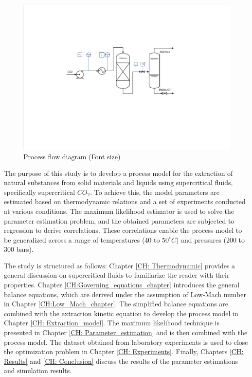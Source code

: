 \documentclass[../Article_Model_Parameters.tex]{subfiles}
\begin{document}
	\begin{figure}[h!]
		\centering
		\includegraphics[width=0.95\columnwidth]{Figures/SFE_PFD_cropped.pdf}
		\caption{Process flow diagram ({\color{red}Font size}) }
		\label{fig: SFE_drawing}
	\end{figure}

	The purpose of this study is to develop a process model for the extraction of natural substances from solid materials and liquids using supercritical fluids, specifically supercritical $CO_2$. To achieve this, the model parameters are estimated based on thermodynamic relations and a set of experiments conducted at various conditions. The maximum likelihood estimator is used to solve the parameter estimation problem, and the obtained parameters are subjected to regression to derive correlations. These correlations enable the process model to be generalized across a range of temperatures (40 to $50^\circ C$) and pressures (200 to 300 bars).
	
	The study is structured as follows: Chapter \ref{CH: Thermodynamic} provides a general discussion on supercritical fluids to familiarize the reader with their properties. Chapter \ref{CH:Governing_equations_chapter} introduces the general balance equations, which are derived under the assumption of Low-Mach number in Chapter \ref{CH:Low_Mach_chapter}. The simplified balance equations are combined with the extraction kinetic equation to develop the process model in Chapter \ref{CH: Extraction_model}. The maximum likelihood technique is presented in Chapter \ref{CH: Parameter_estimation} and is then combined with the process model. The dataset obtained from laboratory experiments is used to close the optimization problem in Chapter \ref{CH: Experiments}. Finally, Chapters \ref{CH: Results} and \ref{CH: Conclusion} discuss the results of the parameter estimations and simulation results.
		
\end{document}
